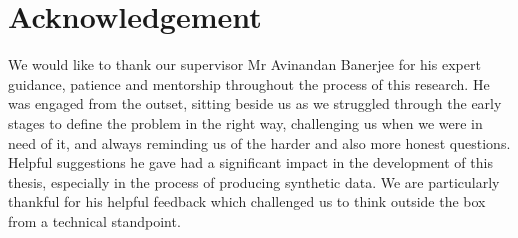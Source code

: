 \section*{Acknowledgement}
We would like to thank our supervisor Mr Avinandan Banerjee for his expert guidance, patience and mentorship throughout the process of this research. He was engaged from the outset, sitting beside us as we struggled through the early stages to define the problem in the right way, challenging us when we were in need of it, and always reminding us of the harder and also more honest questions. Helpful suggestions he gave had a significant impact in the development of this thesis, especially in the process of producing synthetic data. We are particularly thankful for his helpful feedback which challenged us to think outside the box from a technical standpoint.